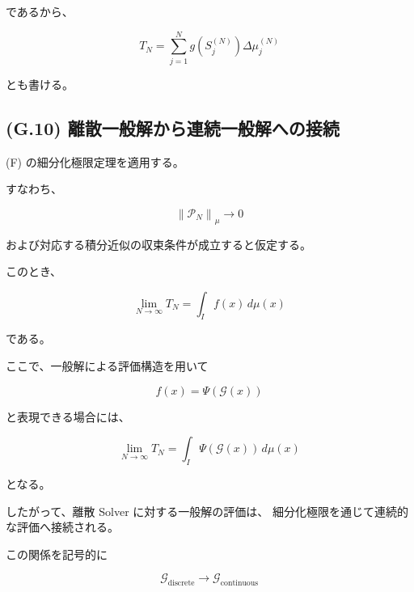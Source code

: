 \documentclass[a4paper,11pt]{article}
\begin{document}
であるから、

\begin{equation}
    T_N
    =
    \sum_{j=1}^{N}
    g\!\left(S_j^{(N)}\right)
    \Delta\mu_j^{(N)}
\end{equation}

とも書ける。


\subsection{(G.10) 離散一般解から連続一般解への接続}
\label{subsec:G10}

(F) の細分化極限定理を適用する。

すなわち、

\begin{equation}
    \left\|
    \mathcal{P}_N
    \right\|_\mu
    \longrightarrow0
\end{equation}

および対応する積分近似の収束条件が成立すると仮定する。

このとき、

\begin{equation}
    \lim_{N\to\infty}
    T_N
    =
    \int_I
    f(x)\,d\mu(x)
\end{equation}

である。

ここで、一般解による評価構造を用いて

\begin{equation}
    f(x)
    =
    \Psi\!\left(\mathcal{G}(x)\right)
\end{equation}

と表現できる場合には、

\begin{equation}
    \boxed{
        \lim_{N\to\infty}
        T_N
        =
        \int_I
        \Psi\!\left(\mathcal{G}(x)\right)
        \,d\mu(x)
    }
    \label{eq:G-continuous-limit}
\end{equation}

となる。

したがって、離散 Solver に対する一般解の評価は、
細分化極限を通じて連続的な評価へ接続される。

この関係を記号的に

\begin{equation}
    \boxed{
        \mathcal{G}_{\mathrm{discrete}}
        \longrightarrow
        \mathcal{G}_{\mathrm{continuous}}
    }
\end{equation}
\end{document}
